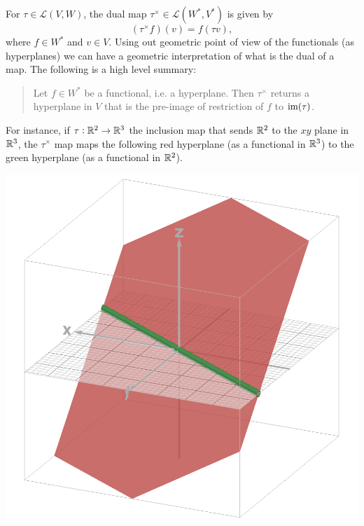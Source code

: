 \begin{observation}
	For $ \tau \in \mathcal{L}(V,W) $, the dual map $ \tau^\times \in \mathcal{L}(W^*,V^*) $ is given by
	\[ (\tau^\times f)(v) = f(\tau v),  \]
	where $ f\in W^* $ and $ v \in V $. Using out geometric point of view of the functionals (as hyperplanes) we can have a geometric interpretation of what is the dual of a map. The following is a high level summary:
	\begin{quote}
		Let $ f\in W^* $ be a functional, i.e. a hyperplane. Then $ \tau^\times $ returns a hyperplane in $ V $ that is the pre-image of restriction of $ f $ to $ \operatorname{im}(\tau) $.
	\end{quote}
	For instance, if $ \tau : \mathbb{R}^2 \to \mathbb{R}^3 $ the inclusion map that sends $ \mathbb{R}^2 $ to the $ xy $ plane in $ \mathbb{R}^3 $, the $ \tau^\times $ map maps the following red hyperplane (as a functional in $ \mathbb{R}^3 $) to the green hyperplane (as a functional in $ \mathbb{R}^2 $).
	\begin{center}
			\includegraphics[width=0.4\linewidth]{Images/DualMap}
	\end{center}
	

\end{observation}
